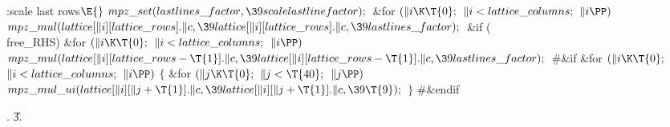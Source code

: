 \Y\B\4:scale last rows\X${}\E{}$\6
$\\{mpz\_set}(\\{lastlines\_factor},\39\\{scalelastlinefactor});{}$\6
\&{for} ${}(\|i\K\T{0};{}$ ${}\|i<\\{lattice\_columns};{}$ ${}\|i\PP){}$\1\5
${}\\{mpz\_mul}(\\{lattice}[\|i][\\{lattice\_rows}].\|c,\39\\{lattice}[\|i][%
\\{lattice\_rows}].\|c,\39\\{lastlines\_factor});{}$\2\6
\&{if} (\\{free\_RHS})\1\6
\&{for} ${}(\|i\K\T{0};{}$ ${}\|i<\\{lattice\_columns};{}$ ${}\|i\PP){}$\1\5
${}\\{mpz\_mul}(\\{lattice}[\|i][\\{lattice\_rows}-\T{1}].\|c,\39\\{lattice}[%
\|i][\\{lattice\_rows}-\T{1}].\|c,\39\\{lastlines\_factor});{}$\2\2\6
\8\#\&{if} \6
\&{for} ${}(\|i\K\T{0};{}$ ${}\|i<\\{lattice\_columns};{}$ ${}\|i\PP){}$\5
${}\{{}$\1\6
\&{for} ${}(\|j\K\T{0};{}$ ${}\|j<\T{40};{}$ ${}\|j\PP){}$\1\5
${}\\{mpz\_mul\_ui}(\\{lattice}[\|i][\|j+\T{1}].\|c,\39\\{lattice}[\|i][\|j+%
\T{1}].\|c,\39\T{9});{}$\2\6
\4${}\}{}$\2\6
\8\#\&{endif}\par
{}.
\U3.\fi

